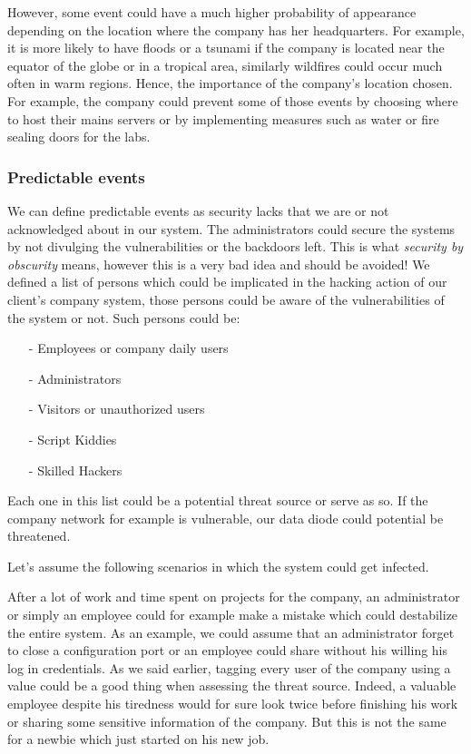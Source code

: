 \documentclass[a4paper,10pt]{article}
\begin{document}
However, some event could have a much higher probability of appearance depending on the location where the company has her headquarters. For example, it is more likely to have floods or a tsunami if the company is located near the equator of the globe or in a tropical area, similarly wildfires could occur much often in warm regions. Hence, the importance of the company's location chosen. For example, the company could prevent some of those events by choosing where to host their mains servers or by implementing measures such as water or fire sealing doors for the labs.

\subsubsection{Predictable events}
We can define predictable events as security lacks that we are or not acknowledged about in our system. The administrators could secure the systems by not divulging the vulnerabilities or the backdoors left. This is what \emph{security by obscurity} means, however this is a very bad idea and should be avoided! We defined a list of persons which could be implicated in the hacking action of our client's company system, those persons could be aware of the vulnerabilities of the system or not. Such persons could be:
\begin{enumerate}
\item[-] Employees or company daily users
\item[-] Administrators
\item[-] Visitors or unauthorized users
\item[-] Script Kiddies
\item[-] Skilled Hackers
\end{enumerate}

Each one in this list could be a potential threat source or serve as so. If the company network for example is vulnerable, our data diode could potential be threatened.

Let's assume the following scenarios in which the system could get infected.

After a lot of work and time spent on projects for the company, an administrator or simply an employee could for example make a mistake which could destabilize the entire system. As an example, we could assume that an administrator forget to close a configuration port or an employee could share without his willing his log in credentials.
As we said earlier, tagging every user of the company using a value could be a good thing when assessing the threat source. Indeed, a valuable employee despite his tiredness would for sure look twice before finishing his work or sharing some sensitive information of the company. But this is not the same for a newbie which just started on his new job.
\end{document}
